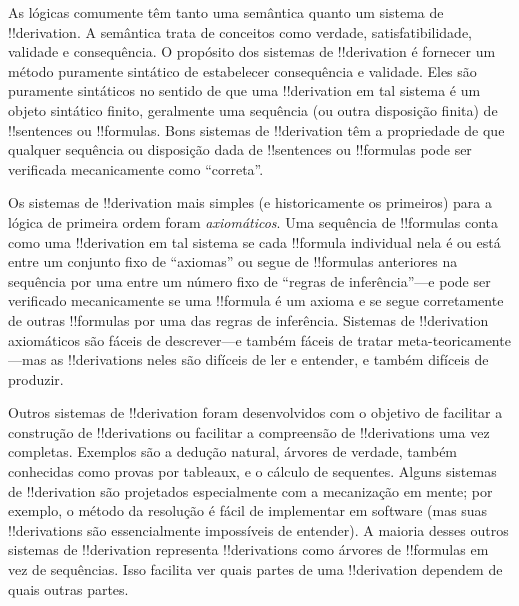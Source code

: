 \documentclass[../../../include/open-logic-section]{subfiles}
\begin{document}
      {}
      {}


As lógicas comumente têm tanto uma semântica quanto um sistema de
!!{derivation}. A semântica trata de conceitos como verdade,
satisfatibilidade, validade e consequência.  O propósito dos sistemas de
!!{derivation} é fornecer um método puramente sintático de estabelecer
consequência e validade.  Eles são puramente sintáticos no sentido de
que uma !!{derivation} em tal sistema é um objeto sintático finito,
geralmente uma sequência (ou outra disposição finita) de !!{sentence}s
ou !!{formula}s.  Bons sistemas de !!{derivation} têm a propriedade de
que qualquer sequência ou disposição dada de !!{sentence}s ou
!!{formula}s pode ser verificada mecanicamente como ``correta''.

Os sistemas de !!{derivation} mais simples (e historicamente os
primeiros) para a lógica de primeira ordem foram \emph{axiomáticos}.
Uma sequência de !!{formula}s conta como uma !!{derivation} em tal
sistema se cada !!{formula} individual nela é ou está entre um conjunto
fixo de ``axiomas'' ou segue de !!{formula}s anteriores na sequência por
uma entre um número fixo de ``regras de inferência''---e pode ser
verificado mecanicamente se uma !!{formula} é um axioma e se segue
corretamente de outras !!{formula}s por uma das regras de inferência.
Sistemas de !!{derivation} axiomáticos são fáceis de descrever---e
também fáceis de tratar meta-teoricamente---mas as !!{derivation}s neles
são difíceis de ler e entender, e também difíceis de produzir.

Outros sistemas de !!{derivation} foram desenvolvidos com o objetivo de
facilitar a construção de !!{derivation}s ou facilitar a compreensão de
!!{derivation}s uma vez completas.  Exemplos são a dedução natural,
árvores de verdade, também conhecidas como provas por tableaux, e o
cálculo de sequentes.  Alguns sistemas de !!{derivation} são projetados
especialmente com a mecanização em mente; por exemplo, o método da
resolução é fácil de implementar em software (mas suas !!{derivation}s
são essencialmente impossíveis de entender). A maioria desses outros
sistemas de !!{derivation} representa !!{derivation}s como árvores de
!!{formula}s em vez de sequências. Isso facilita ver quais partes de
uma !!{derivation} dependem de quais outras partes.
\end{document}
